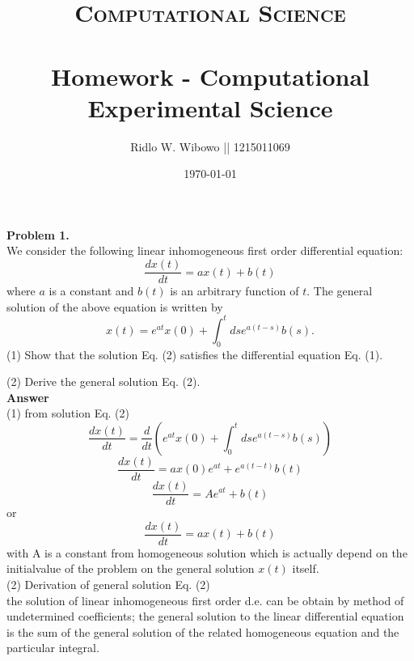 \documentclass[paper=a4, fontsize=11pt]{scrartcl}
\title{	
\normalfont \normalsize 
\textsc{Computational Science} \\ [25pt] %
\horrule{0.5pt} \\[0.2cm] %
\small Homework - Computational Experimental Science\\ %
}
\author{\small{Ridlo W. Wibowo || 1215011069}} %
\date{\small \today} %
\numberwithin{equation}{section} %
\numberwithin{figure}{section} %
\numberwithin{table}{section} %
\begin{document}
\maketitle %

\textbf{Problem 1.}\\
We consider the following linear inhomogeneous first order differential equation:
\begin{equation*}
\frac{dx(t)}{dt} = ax(t) + b(t)
\end{equation*}
where $a$ is a constant and $b(t)$ is an arbitrary function of $t$. The general solution of the above equation is written by
\begin{equation*}
x(t) = e^{at}x(0) + \int_0^t dse^{a(t-s)}b(s).
\end{equation*}
(1) Show that the solution Eq. (2) satisfies the differential equation Eq. (1).


(2) Derive the general solution Eq. (2).\\


\textbf{Answer}\\
(1) from solution Eq. (2)
\begin{equation*}
\frac{dx(t)}{dt} = \frac{d}{dt} \left(e^{at}x(0) + \int_{0}^{t} dse^{a(t-s)}b(s)\right)
\end{equation*}
\begin{equation*}
\frac{dx(t)}{dt} = ax(0)e^{at} + e^{a(t-t)}b(t)
\end{equation*}
\begin{equation*}
\frac{dx(t)}{dt} = Ae^{at} + b(t)
\end{equation*}
or
\begin{equation*}
\frac{dx(t)}{dt} = ax(t) + b(t)
\end{equation*}
with A is a constant from homogeneous solution which is actually depend on the initialvalue of the problem on the general solution $x(t)$ itself.\\


(2) Derivation of general solution Eq. (2)\\
the solution of linear inhomogeneous first order d.e. can be obtain by method of undetermined coefficients; the general solution to the linear differential equation is the sum of the general solution of the related homogeneous equation and the particular integral.\\
\end{document}
